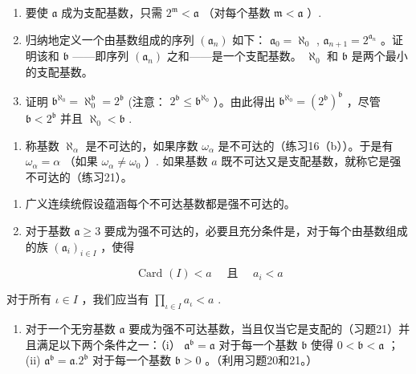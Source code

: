 \begin{enumerate}
\def\labelenumi{(\alph{enumi})}
\item
  要使 \(\mathfrak{a}\) 成为支配基数，只需 \(2^{\mathfrak{m}} < \mathfrak{a}\) （对每个基数 \(\mathfrak{m} < \mathfrak{a}\) ）.
\item
  归纳地定义一个由基数组成的序列 \((\mathfrak{a}_n)\) 如下： \(\mathfrak{a}_0 = \aleph_0\) , \(\mathfrak{a}_{n+1} = 2^{\mathfrak{a}_n}\) 。证明该和 \(\mathfrak{b}\) ——即序列 \((\mathfrak{a}_n)\) 之和——是一个支配基数。 \(\aleph_0\) 和 \(\mathfrak{b}\) 是两个最小的支配基数。
\item
  证明 \(\mathfrak{b}^{\aleph_0} = \aleph_0^{\mathfrak{b}} = 2^{\mathfrak{b}}\) (注意： \(2^{\mathfrak{b}} \leqslant \mathfrak{b}^{\aleph_0}\) ）。由此得出 \(\mathfrak{b}^{\aleph_0} = (2^{\mathfrak{b}})^{\mathfrak{b}}\) ，尽管 \(\mathfrak{b} < 2^{\mathfrak{b}}\) 并且 \(\aleph_0 < \mathfrak{b}\) .
\end{enumerate}

\begin{enumerate}
\def\labelenumi{\arabic{enumi}.}
\setcounter{enumi}{21}
\tightlist
\item
  称基数 \(\aleph_{\alpha}\) 是不可达的，如果序数 \(\omega_{\alpha}\) 是不可达的（练习16（b））。于是有 \(\omega_{\alpha} = \alpha\) （如果 \(\omega_{\alpha} \neq \omega_{0}\) ）. 如果基数 \(a\) 既不可达又是支配基数，就称它是强不可达的（练习21）。
\end{enumerate}

\begin{enumerate}
\def\labelenumi{(\alph{enumi})}
\item
  广义连续统假设蕴涵每个不可达基数都是强不可达的。
\item
  对于基数 \(\mathfrak{a} \geqslant 3\) 要成为强不可达的，必要且充分条件是，对于每个由基数组成的族 \((\mathfrak{a}_i)_{i \in I}\) ，使得
\end{enumerate}

\[
\text { Card } (I) <   a \quad \text { 且 } \quad a _ {i} <   a
\]

对于所有 \(\iota \in I\) ，我们应当有 \(\prod_{\iota \in I} a_{\iota} < a\) .

\begin{enumerate}
\def\labelenumi{(\alph{enumi})}
\setcounter{enumi}{2}
\tightlist
\item
  对于一个无穷基数 \(\mathfrak{a}\) 要成为强不可达基数，当且仅当它是支配的（习题21）并且满足以下两个条件之一：（i） \(\mathfrak{a}^{\mathfrak{b}} = \mathfrak{a}\) 对于每一个基数 \(\mathfrak{b}\) 使得 \(0 < \mathfrak{b} < \mathfrak{a}\) ；(ii) \(\mathfrak{a}^{\mathfrak{b}} = \mathfrak{a}.2^{\mathfrak{b}}\) 对于每一个基数 \(\mathfrak{b} > 0\) 。（利用习题20和21。）
\end{enumerate}

